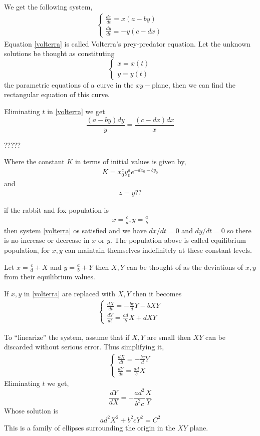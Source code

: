 \documentclass[oneside,11pt,pdftex,final]{book}%
\numberwithin{equation}{section}
\numberwithin{section}{chapter}
\numberwithin{equation}{chapter}
\begin{document}
We get the following system,
\begin{align}\label{volterra}
	\begin{cases}
		\frac{dx}{dt}=x(a-by)\\
		\frac{dy}{dt}=-y(c-dx)
	\end{cases}
\end{align}
Equation \ref{volterra} is called Volterra's prey-predator equation. Let the unknown solutions be thought as constituting \[ \begin{cases}
	x=x(t)\\
	y=y(t)
\end{cases} \]
the parametric equations of a curve in the $ xy- $plane, then we can find the rectangular equation of this curve.

Eliminating $ t $ in \ref{volterra} we get
\[ \frac{(a-by)dy}{y}=\frac{(c-dx)dx}{x} \]

?????

Where the constant $ K $ in terms of initial values is given by,
\begin{align}
	K=x_0^cy_0^ae^{-dx_0-by_0} 
\end{align} 
and \begin{align}
	z=y??
\end{align}

if the rabbit and fox population is \begin{align}
	x=\frac{c}{d}, y=\frac{a}{b}
\end{align}  then system \ref{volterra} os satisfied and we have $ dx/dt=0 $ and $ dy/dt=0 $ so there is no increase or decrease in $ x $ or $ y $. The population above is called equilibrium population, for $ x,y $ can maintain themselves indefinitely at these constant levels.

Let $ x=\frac{c}{d}+X $ and $ y=\frac{a}{b} + Y$ then $ X,Y $ can be thought of as the deviations of $ x,y $ from their equilibrium values.

If $ x,y $ in \ref{volterra} are replaced with $ X,Y $ then it becomes
\begin{align}
	\begin{cases}
		\frac{dX}{dt}=-\frac{bc}{d}Y-bXY\\ 
		\frac{dY}{dt}=\frac{ad}{b}X+dXY
	\end{cases}
\end{align}

To ``linearize'' the system, assume that if $ X,Y $ are small then $ XY $ can be discarded without serious error. Thus simplifying it,
\begin{align}
	\begin{cases}
		\frac{dX}{dt}=-\frac{bc}{d}Y\\ 
		\frac{dY}{dt}=\frac{ad}{b}X
	\end{cases}
\end{align}
Eliminating $ t $ we get,
\[ \frac{dY}{dX}=-\frac{ad^2}{b^2c}\frac{X}{Y} \]
Whose solution is \[ ad^2X^2+b^2cY^2=C^2 \]
This is a family of ellipses surrounding the origin in the $ XY $ plane.
\end{document}
